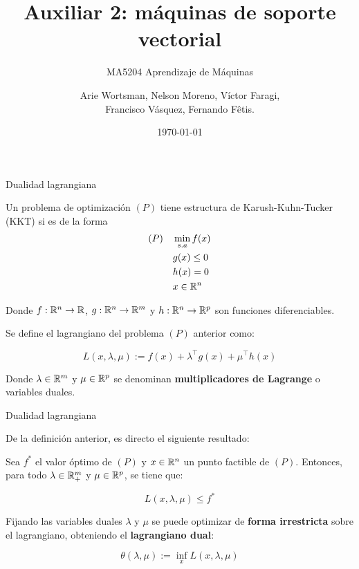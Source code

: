 \documentclass[handout, 9pt]{beamer}
\title{Auxiliar 2: máquinas de soporte vectorial}
\subtitle{MA5204 Aprendizaje de Máquinas}
\date{\today}
\author{Arie Wortsman, Nelson Moreno, Víctor Faragi,\\ Francisco Vásquez, Fernando Fêtis.}
\institute{Departamento de ingeniería matemática\\Universidad de Chile}
\begin{document}
\begin{frame}
  \titlepage
\end{frame}


\begin{frame}{Dualidad lagrangiana}

Un problema de optimización $(P)$  tiene estructura de Karush-Kuhn-Tucker (KKT) si es de la forma
\begin{equation*}
	\begin{aligned}
		(P) \quad& \min_{s.a} f(x)\\
		& g(x) \leq 0\\
		& h(x) = 0\\
		& x\in \mathbb{R}^n
	\end{aligned}
\end{equation*}

Donde $f:\mathbb{R}^n\to\mathbb{R}$, $g:\mathbb{R}^n \to \mathbb{R}^m$ y $h:\mathbb{R}^n \to \mathbb{R}^p$ son funciones diferenciables.\\

\begin{definicion}[Lagrangiano]
	Se define el lagrangiano del problema $(P)$ anterior como:
	
	\begin{equation*}
		L(x,\lambda,\mu) := f(x) + \lambda^\top g(x) + \mu^\top h(x)
	\end{equation*}
	
	Donde $\lambda\in\mathbb{R}^m$ y $\mu\in\mathbb{R}^p$ se denominan \textbf{multiplicadores de Lagrange} o variables duales.
\end{definicion}
\end{frame}

\begin{frame}{Dualidad lagrangiana}

De la definición anterior, es directo el siguiente resultado: 

\begin{lemma}
	Sea $f^*$ el valor óptimo de $(P)$ y $x\in\mathbb{R}^n$ un punto factible de $(P)$. Entonces, para todo $\lambda\in\mathbb{R}^m_+$ y $\mu\in\mathbb{R}^p$, se tiene que:
	
	\begin{equation*}
		L(x,\lambda,\mu)\leq f^*
	\end{equation*}
\end{lemma}

Fijando las variables duales $\lambda$ y $\mu$ se puede optimizar de \textbf{forma irrestricta} sobre el lagrangiano, obteniendo el \textbf{lagrangiano dual}:

\begin{equation*}
	\theta(\lambda,\mu):=\inf_{x} L(x,\lambda,\mu)
\end{equation*} 


\end{frame}
\end{document}
